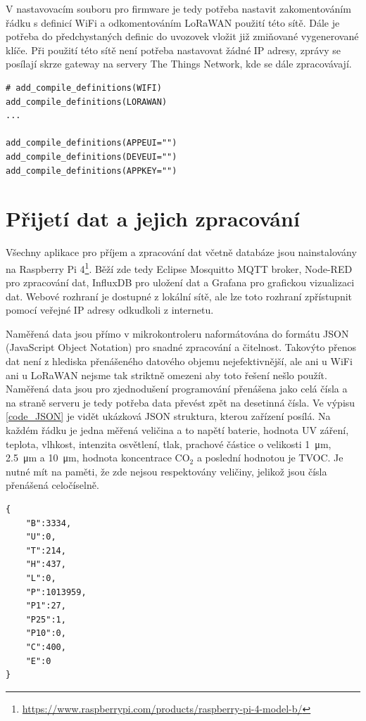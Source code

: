 V nastavovacím souboru pro firmware je tedy potřeba nastavit zakomentováním řádku s definicí WiFi a odkomentováním LoRaWAN použití této sítě. Dále je potřeba do předchystaných definic do uvozovek vložit již zmiňované vygenerované klíče. Při použití této sítě není potřeba nastavovat žádné IP adresy, zprávy se posílají skrze gateway na servery The Things Network, kde se dále zpracovávají.

\begin{lstlisting}[caption={Nastavení spojení pomocí LoRaWAN}]
# add_compile_definitions(WIFI)
add_compile_definitions(LORAWAN)
...

add_compile_definitions(APPEUI="")
add_compile_definitions(DEVEUI="")
add_compile_definitions(APPKEY="")
\end{lstlisting}

\section{Přijetí dat a jejich zpracování}

Všechny aplikace pro příjem a zpracování dat včetně databáze jsou nainstalovány na Raspberry Pi 4\footnote{\url{https://www.raspberrypi.com/products/raspberry-pi-4-model-b/}}. Běží zde tedy Eclipse Mosquitto MQTT broker, Node-RED pro zpracování dat, InfluxDB pro uložení dat a Grafana pro grafickou vizualizaci dat. Webové rozhraní je dostupné z lokální sítě, ale lze toto rozhraní zpřístupnit pomocí veřejné IP adresy odkudkoli z internetu.

Naměřená data jsou přímo v mikrokontroleru naformátována do formátu JSON (JavaScript Object Notation) pro snadné zpracování a čitelnost. Takovýto přenos dat není z hlediska přenášeného datového objemu nejefektivnější, ale ani u WiFi ani u LoRaWAN nejsme tak striktně omezeni aby toto řešení nešlo použít. Naměřená data jsou pro zjednodušení programování přenášena jako celá čísla a na straně serveru je tedy potřeba data převést zpět na desetinná čísla. Ve výpisu \ref{code_JSON} je vidět ukázková JSON struktura, kterou zařízení posílá. Na každém řádku je jedna měřená veličina a to napětí baterie, hodnota UV záření, teplota, vlhkost, intenzita osvětlení, tlak, prachové částice o velikosti \SI{1}{\micro\metre}, \SI{2.5}{\micro\metre} a \SI{10}{\micro\metre}, hodnota koncentrace CO$_2$ a poslední hodnotou je TVOC. Je nutné mít na paměti, že zde nejsou respektovány veličiny, jelikož jsou čísla přenášená celočíselně.

\begin{lstlisting}[caption={Příklad zasílané JSON zprávy.}, label={code_JSON}]
{
    "B":3334,
    "U":0,
    "T":214,
    "H":437,
    "L":0,
    "P":1013959,
    "P1":27,
    "P25":1,
    "P10":0,
    "C":400,
    "E":0
}
\end{lstlisting}

